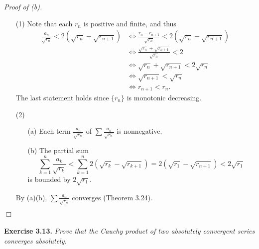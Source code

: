 \documentclass{article}
\begin{document}
\emph{Proof of (b).}
\begin{enumerate}
\item[(1)]
Note that each $r_n$ is positive and finite, and thus
\begin{align*}
  \frac{a_n}{\sqrt{r_n}} < 2(\sqrt{r_n} - \sqrt{r_{n+1}})
  &\Longleftrightarrow
  \frac{r_n - r_{n+1}}{\sqrt{r_n}} < 2(\sqrt{r_n} - \sqrt{r_{n+1}}) \\
  &\Longleftrightarrow
  \frac{\sqrt{r_n} + \sqrt{r_{n+1}}}{\sqrt{r_n}} < 2 \\
  &\Longleftrightarrow
  \sqrt{r_n} + \sqrt{r_{n+1}} < 2 \sqrt{r_n} \\
  &\Longleftrightarrow
  \sqrt{r_{n+1}} < \sqrt{r_n} \\
  &\Longleftrightarrow
  r_{n+1} < r_n.
\end{align*}
The last statement holds since $\{r_n\}$ is monotonic decreasing.
\item[(2)]
  \begin{enumerate}
  \item[(a)]
  Each term $\frac{a_n}{\sqrt{r_n}}$ of $\sum \frac{a_n}{\sqrt{r_n}}$ is nonnegative.
  \item[(b)]
  The partial sum
  $$\sum_{k=1}^{n} \frac{a_k}{\sqrt{r_k}}
  < \sum_{k=1}^{n} 2(\sqrt{r_k} - \sqrt{r_{k+1}})
  = 2(\sqrt{r_1} - \sqrt{r_{n+1}})
  < 2\sqrt{r_1}$$
  is bounded by $2\sqrt{r_1}$.
  \end{enumerate}
  By (a)(b), $\sum \frac{a_n}{\sqrt{r_n}}$ converges (Theorem 3.24).
\end{enumerate}
$\Box$ \\\\






\textbf{Exercise 3.13.}
\emph{Prove that the Cauchy product of two absolutely convergent series
converges absolutely.} \\
\end{document}

